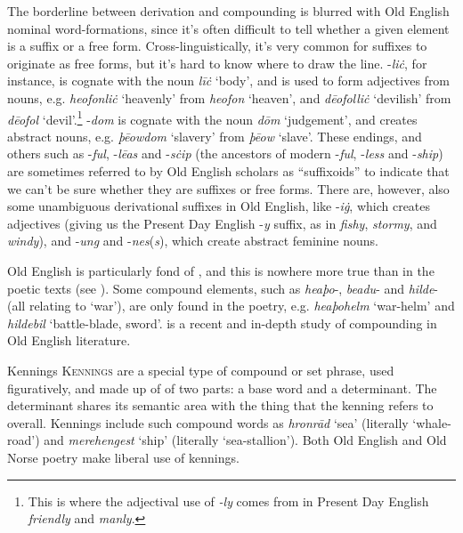 \noindent The borderline between derivation and compounding is blurred with Old English nominal word-formations, since it's often difficult to tell whether a given element is a suffix or a free form. Cross-linguistically, it's very common for suffixes to originate as  free forms, but it's hard to know where to draw the line. -\emph{liċ}, for instance, is cognate with the noun \emph{līċ} `body', and is used to form adjectives from nouns, e.g. \emph{heofonliċ} `heavenly' from \emph{heofon} `heaven', and \emph{dēofolliċ} `devilish' from \emph{dēofol} `devil'.\footnote{This is where the adjectival use of \textit{-ly} comes from in Present Day English \textit{friendly} and \textit{manly}.} -\emph{dom} is cognate with the noun \emph{dōm} `judgement', and creates abstract nouns, e.g. \emph{þēowdom} `slavery' from \emph{þēow} `slave'. These endings, and others such as -\emph{ful}, -\emph{lēas} and -\emph{sċip} (the ancestors of modern -\emph{ful}, \linebreak-\emph{less} and -\emph{ship}) are sometimes referred to by Old English scholars as ``suffixoids'' to indicate that we can't be sure whether they are suffixes or free forms. There are, however, also some unambiguous derivational suffixes in Old English, like -\emph{iġ}, which creates adjectives (giving us the Present Day English -\textit{y} suffix, as in \textit{fishy}, \textit{stormy}, and \textit{windy}), and -\emph{ung} and -\emph{nes}(\emph{s}), which create abstract feminine nouns.

Old English is particularly fond of , and this is nowhere more true than in the poetic texts (see \citealp{Godden1992}). Some compound elements, such as \emph{heaþo}-, \emph{beadu}- and \emph{hilde}- (all relating to `war'), are only found in the poetry, e.g. \emph{heaþohelm} `war-helm' and \emph{hildebil} `battle-blade, sword'. \citet{DavisSecord2016} is a recent and in-depth study of compounding in Old English literature.


\begin{miscbox}{Kennings}
\textsc{Kennings} are a special type of compound or set phrase, used figuratively, and made up of of two parts: a base word and a determinant. The determinant shares its semantic area with the thing that the kenning refers to overall. Kennings include such compound words as \emph{hronrād} `sea' (literally `whale-road') and \emph{merehengest} `ship' (literally `sea-stallion'). Both Old English and Old Norse poetry make liberal use of kennings.
\end{miscbox}


